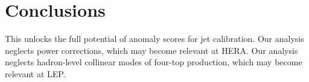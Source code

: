 \section{Conclusions}\label{sec:conclusions}

This unlocks the full potential of anomaly scores for jet calibration.
Our analysis neglects power corrections, which may become relevant at
HERA. Our analysis neglects hadron-level collinear modes of four-top
production, which may become relevant at LEP.

